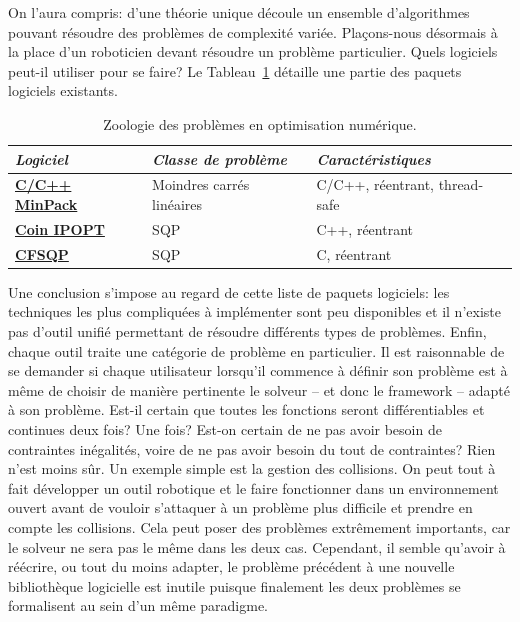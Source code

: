 On l'aura compris: d'une théorie unique découle un ensemble
d'algorithmes pouvant résoudre des problèmes de complexité
variée. Plaçons-nous désormais à la place d'un roboticien devant
résoudre un problème particulier. Quels logiciels peut-il utiliser
pour se faire? Le Tableau \ref{tab:chap1_soft} détaille une partie
des paquets logiciels existants.
%
\begin{table}
\begin{center}
\begin{tabular}{|p{}|p{}|p{}|}
\hline
\textit{Logiciel} & \textit{Classe de problème} & \textit{Caractéristiques}\\
\hline
\textbf{\href{http://devernay.free.fr/hacks/cminpack/index.html}{C/C++ MinPack}} & Moindres carrés linéaires & C/C++, réentrant, thread-safe \\
\hline
\textbf{\href{https://projects.coin-or.org/Ipopt}{Coin IPOPT}} & SQP & C++, réentrant \\
\hline
\textbf{\href{http://www.aemdesign.com/}{CFSQP}} & SQP & C, réentrant \\
\hline
\end{tabular}
\end{center}
\caption{Zoologie des problèmes en optimisation numérique. \label{tab:chap1_soft}}
\end{table}
%
Une conclusion s'impose au regard de cette liste de paquets logiciels:
les techniques les plus compliquées à implémenter sont peu disponibles
et il n'existe pas d'outil unifié permettant de résoudre différents
types de problèmes. Enfin, chaque outil traite une catégorie de
problème en particulier. Il est raisonnable de se demander si chaque
utilisateur lorsqu'il commence à définir son problème est à même de
choisir de manière pertinente le solveur -- et donc le framework --
adapté à son problème. Est-il certain que toutes les fonctions seront
différentiables et continues deux fois? Une fois? Est-on certain de ne
pas avoir besoin de contraintes inégalités, voire de ne pas avoir
besoin du tout de contraintes? Rien n'est moins sûr. Un exemple simple
est la gestion des collisions. On peut tout à fait développer un outil
robotique et le faire fonctionner dans un environnement ouvert avant
de vouloir s'attaquer à un problème plus difficile et prendre en
compte les collisions. Cela peut poser des problèmes extrêmement
importants, car le solveur ne sera pas le même dans les deux
cas. Cependant, il semble qu'avoir à réécrire, ou tout du moins
adapter, le problème précédent à une nouvelle bibliothèque logicielle
est inutile puisque finalement les deux problèmes se formalisent au
sein d'un même paradigme.


